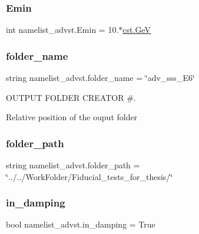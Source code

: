 \subsubsection{\texorpdfstring{Emin}{Emin}}
{\footnotesize\ttfamily int namelist\+\_\+advst.\+Emin = 10.$\ast$\hyperlink{constants_8h_aec0e126d9991db8ad0b26139f5860568}{cst.\+GeV}}

\mbox{\label{namespacenamelist__advst_aed61e4f60a73b3b17c11d94f03046285}} 
\subsubsection{\texorpdfstring{folder\+\_\+name}{folder\_name}}
{\footnotesize\ttfamily string namelist\+\_\+advst.\+folder\+\_\+name = \char`\"{}adv\+\_\+sss\+\_\+\+E6\char`\"{}}



O\+U\+T\+P\+UT F\+O\+L\+D\+ER C\+R\+E\+A\+T\+OR \#. 

Relative position of the ouput folder \mbox{\label{namespacenamelist__advst_ac4af9d0b4fb1c8e072a43b5ee91eb5e5}} 
\subsubsection{\texorpdfstring{folder\+\_\+path}{folder\_path}}
{\footnotesize\ttfamily string namelist\+\_\+advst.\+folder\+\_\+path = \char`\"{}../../Work\+Folder/Fiducial\+\_\+tests\+\_\+for\+\_\+thesis/\char`\"{}}

\mbox{\label{namespacenamelist__advst_ae336d9ef26a053fb740c57860ec65f98}} 
\subsubsection{\texorpdfstring{in\+\_\+damping}{in\_damping}}
{\footnotesize\ttfamily bool namelist\+\_\+advst.\+in\+\_\+damping = True}



